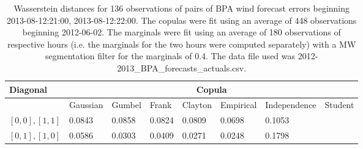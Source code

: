 \begin{table}[h] 
    \centering 
    \begin{tabular}{|l|l|l|l|l|l|l|l|} \hline 
        \textbf{Diagonal} & \multicolumn{7}{c|}{\textbf{Copula}} \\ \hline 
        & Gaussian & Gumbel & Frank & Clayton & Empirical & Independence & Student \\ \hline 
        $[0,0], [1,1]$ & 0.0843 & 0.0858 & 0.0824 & 0.0809 & 0.0698 & 0.1053 &  \\ \hline 
        $[0,1], [1,0]$ & 0.0586 & 0.0303 & 0.0409 & 0.0271 & 0.0248 & 0.1798 &  \\ \hline 
    \end{tabular} 
    \caption{Wasserstein distances for 136 observations of pairs of BPA wind forecast errors beginning 2013-08-12:21:00, 2013-08-12:22:00. The copulas were fit  using an average of 448 observations beginning 2012-06-02. The marginals were fit using an average of 180 observations of respective hours (i.e. the  marginals for the two hours were computed separately) with a MW segmentation filter for the marginals of 0.4. The data file used was 2012-2013\_BPA\_forecasts\_actuals.csv.} 
\end{table}